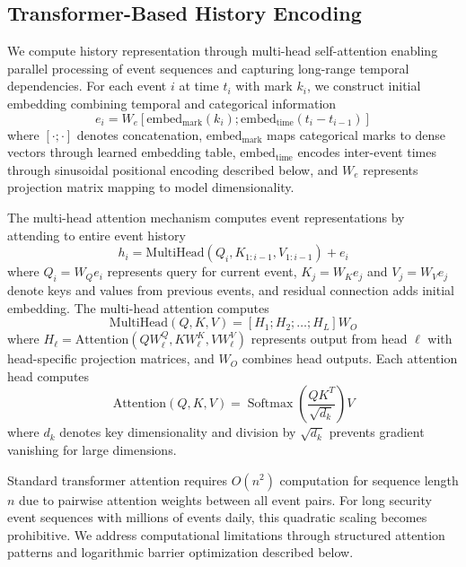 \documentclass[10pt,journal,compsoc]{IEEEtran}
\newcommand{\Softmax}{\operatorname{Softmax}}
\begin{document}
\subsection{Transformer-Based History Encoding}

We compute history representation through multi-head self-attention enabling parallel processing of event sequences and capturing long-range temporal dependencies. For each event $i$ at time $t_i$ with mark $k_i$, we construct initial embedding combining temporal and categorical information
\begin{equation}
e_i = W_e \left[\text{embed}_{\text{mark}}(k_i); \text{embed}_{\text{time}}(t_i - t_{i-1})\right]
\end{equation}
where $[\cdot; \cdot]$ denotes concatenation, $\text{embed}_{\text{mark}}$ maps categorical marks to dense vectors through learned embedding table, $\text{embed}_{\text{time}}$ encodes inter-event times through sinusoidal positional encoding described below, and $W_e$ represents projection matrix mapping to model dimensionality.

The multi-head attention mechanism computes event representations by attending to entire event history
\begin{equation}
h_i = \text{MultiHead}(Q_i, K_{1:i-1}, V_{1:i-1}) + e_i
\end{equation}
where $Q_i = W_Q e_i$ represents query for current event, $K_j = W_K e_j$ and $V_j = W_V e_j$ denote keys and values from previous events, and residual connection adds initial embedding. The multi-head attention computes
\begin{equation}
\text{MultiHead}(Q, K, V) = [H_1; H_2; \ldots; H_L] W_O
\end{equation}
where $H_\ell = \text{Attention}(Q W_\ell^Q, K W_\ell^K, V W_\ell^V)$ represents output from head $\ell$ with head-specific projection matrices, and $W_O$ combines head outputs. Each attention head computes
\begin{equation}
\text{Attention}(Q, K, V) = \Softmax\left(\frac{QK^T}{\sqrt{d_k}}\right) V
\end{equation}
where $d_k$ denotes key dimensionality and division by $\sqrt{d_k}$ prevents gradient vanishing for large dimensions.

Standard transformer attention requires $O(n^2)$ computation for sequence length $n$ due to pairwise attention weights between all event pairs. For long security event sequences with millions of events daily, this quadratic scaling becomes prohibitive. We address computational limitations through structured attention patterns and logarithmic barrier optimization described below.
\end{document}
